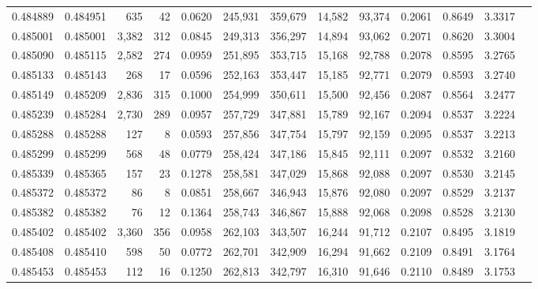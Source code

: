 \begin{tabular}{rrrrrrrrrrrrr}
0.484889 & 0.484951 &   635 &    42 &                                     0.0620 & 245,931 & 359,679 &  14,582 &  93,374 & 0.2061 & 0.8649 & 3.3317 \\
0.485001 & 0.485001 & 3,382 &   312 &                                     0.0845 & 249,313 & 356,297 &  14,894 &  93,062 & 0.2071 & 0.8620 & 3.3004 \\
0.485090 & 0.485115 & 2,582 &   274 &                                     0.0959 & 251,895 & 353,715 &  15,168 &  92,788 & 0.2078 & 0.8595 & 3.2765 \\
0.485133 & 0.485143 &   268 &    17 &                                     0.0596 & 252,163 & 353,447 &  15,185 &  92,771 & 0.2079 & 0.8593 & 3.2740 \\
0.485149 & 0.485209 & 2,836 &   315 &                                     0.1000 & 254,999 & 350,611 &  15,500 &  92,456 & 0.2087 & 0.8564 & 3.2477 \\
0.485239 & 0.485284 & 2,730 &   289 &                                     0.0957 & 257,729 & 347,881 &  15,789 &  92,167 & 0.2094 & 0.8537 & 3.2224 \\
0.485288 & 0.485288 &   127 &     8 &                                     0.0593 & 257,856 & 347,754 &  15,797 &  92,159 & 0.2095 & 0.8537 & 3.2213 \\
0.485299 & 0.485299 &   568 &    48 &                                     0.0779 & 258,424 & 347,186 &  15,845 &  92,111 & 0.2097 & 0.8532 & 3.2160 \\
0.485339 & 0.485365 &   157 &    23 &                                     0.1278 & 258,581 & 347,029 &  15,868 &  92,088 & 0.2097 & 0.8530 & 3.2145 \\
0.485372 & 0.485372 &    86 &     8 &                                     0.0851 & 258,667 & 346,943 &  15,876 &  92,080 & 0.2097 & 0.8529 & 3.2137 \\
0.485382 & 0.485382 &    76 &    12 &                                     0.1364 & 258,743 & 346,867 &  15,888 &  92,068 & 0.2098 & 0.8528 & 3.2130 \\
0.485402 & 0.485402 & 3,360 &   356 &                                     0.0958 & 262,103 & 343,507 &  16,244 &  91,712 & 0.2107 & 0.8495 & 3.1819 \\
0.485408 & 0.485410 &   598 &    50 &                                     0.0772 & 262,701 & 342,909 &  16,294 &  91,662 & 0.2109 & 0.8491 & 3.1764 \\
0.485453 & 0.485453 &   112 &    16 &                                     0.1250 & 262,813 & 342,797 &  16,310 &  91,646 & 0.2110 & 0.8489 & 3.1753 \\

\end{tabular}
